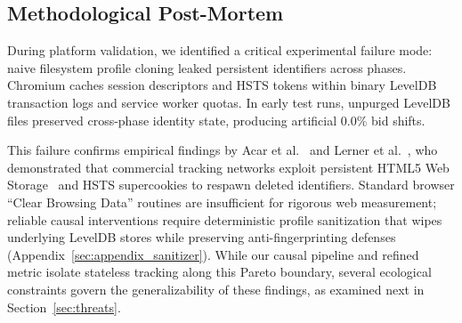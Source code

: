 \subsection{Methodological Post-Mortem}
\label{subsec:post_mortem}

During platform validation, we identified a critical experimental failure mode: naive filesystem profile cloning leaked persistent identifiers across phases. 
Chromium caches session descriptors and HSTS tokens within binary LevelDB transaction logs and service worker quotas. In early test runs, unpurged LevelDB files preserved cross-phase identity state, producing artificial $0.0\%$ bid shifts.

This failure confirms empirical findings by Acar et al.~\cite{acar2014web} and Lerner et al.~\cite{lerner2016internet}, who demonstrated that commercial tracking networks exploit persistent HTML5 Web Storage~\cite{whatwg_webstorage} and HSTS supercookies to respawn deleted identifiers. Standard browser ``Clear Browsing Data'' routines are insufficient for rigorous web measurement; reliable causal interventions require deterministic profile sanitization that wipes underlying LevelDB stores while preserving anti-fingerprinting defenses (Appendix~\ref{sec:appendix_sanitizer}). 
While our causal pipeline and refined metric isolate stateless tracking along this Pareto boundary, several ecological constraints govern the generalizability of these findings, as examined next in Section~\ref{sec:threats}.